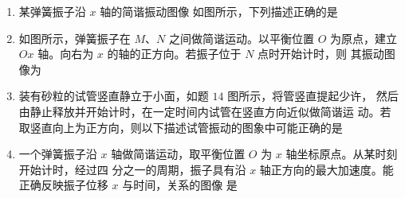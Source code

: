 

\begin{enumerate}
	\item
{}
某弹簧振子沿 $ x $ 轴的简谐振动图像
如图所示，下列描述正确的是  
\begin{figure}[h!]
	\centering
	
\end{figure}



\item 
{}
如图所示，弹簧振子在 $ M $、$ N $ 之间做简谐运动。以平衡位置 $ O $ 为原点，建立 $ Ox $
轴。向右为 $ x $ 的轴的正方向。若振子位于 $ N $ 点时开始计时，则
其振动图像为  
\begin{figure}[h!]
	\centering
	
\end{figure}


\pfourchoices
{}
{}
{}
{}

\item 
{}
装有砂粒的试管竖直静立于小面，如题 $ 14 $ 图所示，将管竖直提起少许，
然后由静止释放并开始计时，在一定时间内试管在竖直方向近似做简谐运
动。若取竖直向上为正方向，则以下描述试管振动的图象中可能正确的是  
\begin{figure}[h!]
	\centering
	 
\end{figure}

\pfourchoices
{}
{}
{}
{}


\item 
{}
一个弹簧振子沿 $ x $ 轴做简谐运动，取平衡位置 $ O $ 为 $ x $ 轴坐标原点。从某时刻开始计时，经过四
分之一的周期，振子具有沿 $ x $ 轴正方向的最大加速度。能正确反映振子位移 $ x $ 与时间，关系的图像
是  


\end{enumerate}
